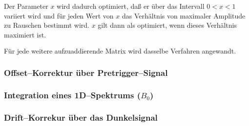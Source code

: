 \documentclass{article}
\begin{document}
Der Parameter $x$ wird dadurch optimiert, daß er über das Intervall $0 < x < 1$
variiert wird und für jeden Wert von $x$ das Verhältnis von maximaler Amplitude
zu Rauschen bestimmt wird. $x$ gilt dann als optimiert, wenn dieses Verhältnis
maximiert ist.

Für jede weitere aufzuaddierende Matrix wird dasselbe Verfahren angewandt.


\subsubsection{Offset--Korrektur über Pretrigger--Signal}


\subsubsection{Integration eines 1D--Spektrums ($B_0$)}


\subsubsection{Drift--Korrekur über das Dunkelsignal}



\end{document}

